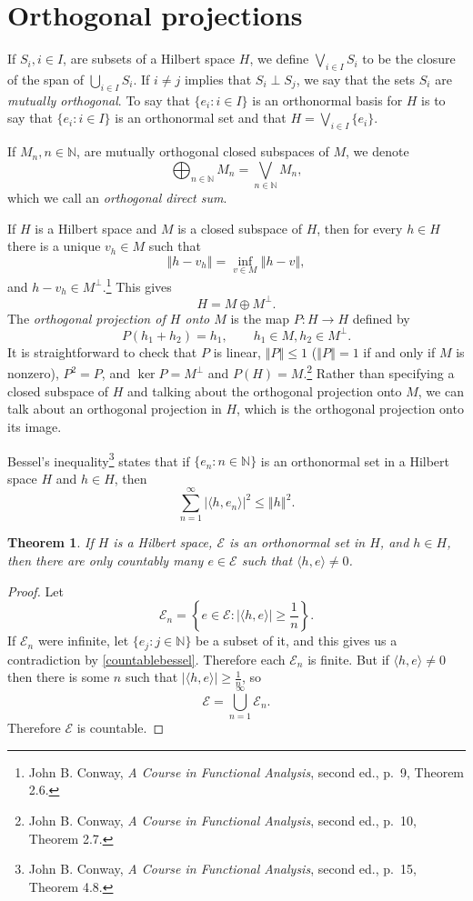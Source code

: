 \documentclass{article}
\newcommand{\inner}[2]{\langle #1, #2 \rangle}
\newcommand{\norm}[1]{\left\Vert #1 \right\Vert}
\newtheorem{theorem}{Theorem}
\begin{document}
\section{Orthogonal projections}
If $S_i, i \in I$, are subsets of a Hilbert space $H$, we define $\bigvee_{i \in I} S_i$ to be the closure of the span of $\bigcup_{i \in I} S_i$.
If $i \neq j$ implies that $S_i \perp S_j$, we say that the sets $S_i$ are {\em mutually orthogonal}. 
To say that $\{e_i:i \in I\}$ is an orthonormal basis for $H$ is to say that $\{e_i: i \in I\}$ is an orthonormal set and that
$H = \bigvee_{i \in I} \{e_i\}$.


If $M_n, n \in \mathbb{N}$, are mutually orthogonal closed subspaces of $M$, we denote
\[
\bigoplus_{n \in \mathbb{N}} M_n = \bigvee_{n \in \mathbb{N}} M_n,
\]
which we call an {\em orthogonal direct sum}.

If $H$ is a Hilbert space and $M$ is a closed subspace of $H$, then for every $h \in H$ there is a unique $v_h \in M$ such that
\[
\norm{h-v_h} = \inf_{v \in M} \norm{h-v},
\]
and $h-v_h \in M^\perp$.\footnote{John
B. Conway, {\em A Course in Functional Analysis}, second ed., p.~9, Theorem 2.6.}
This gives
\[
H=M \oplus M^\perp.
\]
The {\em orthogonal projection of $H$ onto $M$} is the map $P:H \to H$ defined by
\[
P(h_1+h_2)=h_1, \qquad h_1 \in M, h_2 \in M^\perp.
\]
It is straightforward
to check that $P$ is linear,  $\norm{P} \leq 1$ ($\norm{P}=1$ if and only if $M$ is nonzero),  $P^2=P$, and $\ker P=M^\perp$ and $P(H) = M$.\footnote{John B. Conway,
{\em A Course in Functional Analysis}, second ed., p.~10, Theorem 2.7.} Rather than specifying a closed subspace of $H$ and talking about the orthogonal projection
onto $M$, we can talk about an orthogonal projection in $H$, which is the orthogonal projection onto its image.

Bessel's inequality\footnote{John B. Conway, {\em A Course in Functional Analysis}, second ed., p.~15, Theorem 4.8.} states that if $\{e_n: n \in \mathbb{N}\}$ is an orthonormal set in a Hilbert
space $H$ and $h \in H$, then
\begin{equation}
\sum_{n=1}^\infty |\inner{h}{e_n}|^2 \leq \norm{h}^2.
\label{countablebessel}
\end{equation}

\begin{theorem}
If $H$ is a Hilbert space, $\mathscr{E}$ is an orthonormal set in $H$, and $h \in H$, then  there are only countably many
$e \in \mathscr{E}$ such that $\inner{h}{e} \neq 0$.
\label{countable}
\end{theorem}
\begin{proof}
Let
\[
\mathscr{E}_n = \left\{ e \in \mathscr{E}: |\inner{h}{e}| \geq \frac{1}{n}\right\}.
\]
If $\mathscr{E}_n$ were infinite, let $\{e_j : j \in \mathbb{N}\}$ be a subset of it, and this gives us a contradiction by \eqref{countablebessel}.
Therefore each $\mathscr{E}_n$ is finite. But if $\inner{h}{e} \neq 0$ then there is some $n$ such that $|\inner{h}{e}| \geq \frac{1}{n}$,
so
\[
\mathscr{E} = \bigcup_{n=1}^\infty \mathscr{E}_n.
\]
Therefore $\mathscr{E}$ is countable.
\end{proof}
\end{document}
